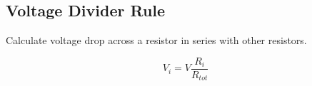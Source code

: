 
\subsection{Voltage Divider Rule} %
	
	Calculate voltage drop across a resistor in series with other resistors.
	
	\[
		V_i = V \frac{R_i}{R_{tot}}
	\]
	

